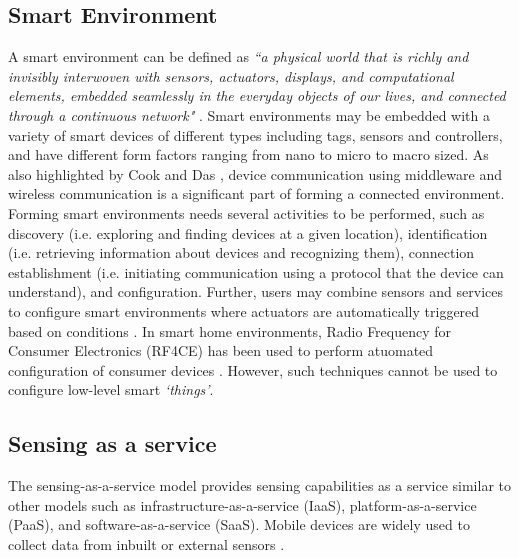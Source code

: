 \documentclass[graybox]{svmult}
\begin{document}
\subsection{Smart Environment}
\label{sec:BM:Smart_Environment}

A smart environment can be defined as \textit{``a physical world that is richly and invisibly interwoven with sensors, actuators, displays, and computational  elements, embedded seamlessly in the everyday objects of our lives, and connected through a continuous network"} \cite{P633}. Smart environments may be embedded with a variety of smart devices of different types including tags, sensors and controllers, and have different form factors ranging from nano to micro to macro sized. As also highlighted by Cook and Das \cite{P634}, device communication using middleware and wireless communication is a significant part of forming a connected environment. Forming smart environments needs several activities to be performed, such as discovery (i.e. exploring and finding devices at a given location), identification (i.e. retrieving information about devices and recognizing them), connection establishment (i.e. initiating communication using a protocol that the device can understand), and configuration. Further, users may combine sensors and services to configure smart environments where actuators are automatically triggered based on conditions \cite{E4}. In smart home environments, Radio Frequency for Consumer Electronics (RF4CE) has been used to perform atuomated configuration of consumer devices \cite{E6}. However, such techniques cannot be used to configure low-level smart \textit{`things'}.




\vspace{-8pt}

\subsection{Sensing as a service}
\label{sec:BM:Sensing_as_a_service}

The sensing-as-a-service  model \cite{ZMP008} provides sensing capabilities as a service similar to other models such as infrastructure-as-a-service (IaaS), platform-as-a-service (PaaS), and software-as-a-service (SaaS). Mobile devices are widely used to collect data from inbuilt or external sensors \cite{E2}.
\end{document}

